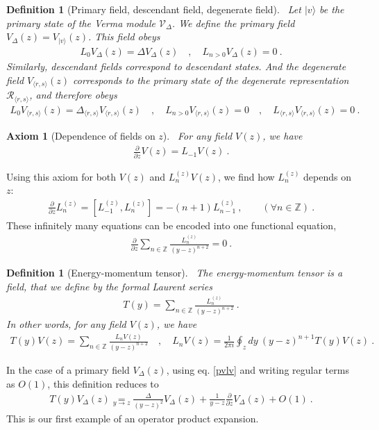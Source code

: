 \documentclass[12pt, a4paper]{article}
\theoremstyle{break}
\newtheorem{hyp}[exo]{Axiom}
\newtheorem{defn}[exo]{Definition}
\begin{document}
\begin{defn}[Primary field, descendant field, degenerate field]
~\label{def:pfdf}
Let $|v\rangle$ be the primary state of the Verma module $\mathcal V_\Delta$.
We define the primary field $V_\Delta(z)=V_{|v\rangle}(z)$. This field obeys
\begin{align}
 L_0 V_\Delta(z) = \Delta V_\Delta(z) \quad , \quad  L_{n> 0} V_\Delta(z) = 0 \ .
\end{align}
Similarly, descendant fields correspond to descendant states. And the degenerate field $V_{\langle r,s\rangle}(z)$ corresponds to the primary state of the degenerate representation $\mathcal{R}_{\langle r,s\rangle}$, and therefore obeys 
\begin{align}
L_0 V_{\langle r,s\rangle}(z) = \Delta_{\langle r,s\rangle} V_{\langle r,s\rangle}(z) \quad , \quad  L_{n> 0} V_{\langle r,s\rangle}(z) = 0 \quad , \quad L_{\langle r, s\rangle} V_{\langle r,s\rangle}(z) = 0\ .
\end{align}
\end{defn}

\begin{hyp}[Dependence of fields on $z$]
 ~\label{hyp:geom}
 For any field $V(z)$, we have 
 \begin{align}
  \frac{\partial}{\partial z} V(z) = L_{-1} V(z)  \ .
  \label{pvlv}
 \end{align}
\end{hyp}
Using this axiom for both $V(z)$ and $L_n^{(z)}V(z)$, we find how $L_n^{(z)}$ depends on $z$:
\begin{align}
 \frac{\partial}{\partial z} L_n^{(z)} = [L_{-1}^{(z)},L_n^{(z)}]= -(n+1)L_{n-1}^{(z)}\ ,\qquad (\forall n\in\mathbb{Z})\ .
\end{align}
These infinitely many equations can be encoded into one functional equation,
\begin{align}
 \frac{\partial}{\partial z} \sum_{n\in\mathbb{Z}} \frac{L_n^{(z)}}{(y-z)^{n+2}} = 0\ .
\end{align}

\begin{defn}[Energy-momentum tensor]
 ~\label{def:em}
 The energy-momentum tensor is a field, that we define by the formal Laurent series
 \begin{align}
  T(y) = \sum_{n\in\mathbb{Z}} \frac{L_n^{(z)}}{(y-z)^{n+2}} \ .
 \end{align}
In other words, for any field $V(z)$, we have 
\begin{align}
 T(y)V(z) = \sum_{n\in\mathbb{Z}} \frac{L_n V(z)}{(y-z)^{n+2}}\quad , \quad L_n V(z) = \frac{1}{2\pi i} \oint_{z}dy\ (y-z)^{n+1} T(y)V(z)\ .
 \label{eq:lvtv}
\end{align}
\end{defn}
In the case of a primary field $V_\Delta(z)$, using eq. \eqref{pvlv} and writing regular terms as $O(1)$, this definition reduces to
\begin{align}
 T(y)V_\Delta(z) \underset{y\to z}{=} \frac{\Delta}{(y-z)^2} V_\Delta(z) + \frac{1}{y-z} \frac{\partial}{\partial z} V_\Delta(z) + O(1)\ . 
 \label{eq:tvd}
\end{align}
This is our first example of an operator product expansion.
\end{document}
